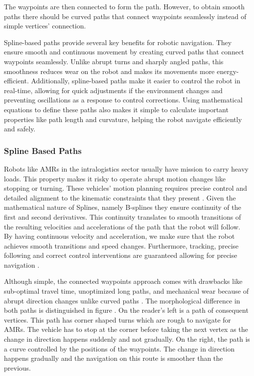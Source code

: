 The waypoints are then connected to form the path.
However, to obtain smooth paths there should be curved paths that connect waypoints seamlessly instead 
of simple vertices' connection. 

Spline-based paths provide several key benefits for robotic navigation. They ensure smooth and continuous movement by 
creating curved paths that connect waypoints seamlessly. Unlike abrupt turns and sharply angled paths, this smoothness 
reduces wear on the robot and makes its movements more energy-efficient. Additionally, spline-based paths make it 
easier to control the robot in real-time, allowing for quick adjustments if the environment changes and preventing 
oscillations as a response to control corrections. Using mathematical 
equations to define these paths also makes it simple to calculate important 
properties like path length and curvature, helping the robot navigate efficiently and safely. 

\subsubsection{Spline Based Paths}
Robots like AMRs in the intralogistics sector usually have mission to carry heavy loads. 
This property makes it risky to operate abrupt motion changes like stopping or turning.
These vehicles' motion planning requires precise control and detailed alignment to the 
kinematic constraints that they present \cite{R30}.
Given the mathematical nature of Splines, namely B-splines they ensure continuity of 
the first and second derivatives.
This continuity translates to smooth transitions of the resulting velocities and accelerations of the path
that the robot will follow. By having continuous velocity and acceleration, we make sure that the robot
achieves smooth transitions and speed changes. Furthermore, tracking, precise following and correct control
interventions are guaranteed allowing for precise navigation \cite{R30}. 

 
Although simple,
the connected waypoints approach comes with drawbacks like sub-optimal travel time, unoptimized long paths, 
and mechanical wear because of abrupt direction changes unlike curved paths \cite{R30}. The morphological 
difference in both paths is distinguished in figure . 
On the reader's left is a path of consequent vertices. This path has corner shaped turns which are rough to 
navigate for AMRs. The vehicle has to stop at the corner before taking the next vertex 
as the change in direction happens suddenly and not gradually.
On the right, the path is a curve controlled by the positions of the waypoints. 
The change in direction happens gradually and the navigation on this route is smoother than the previous.

